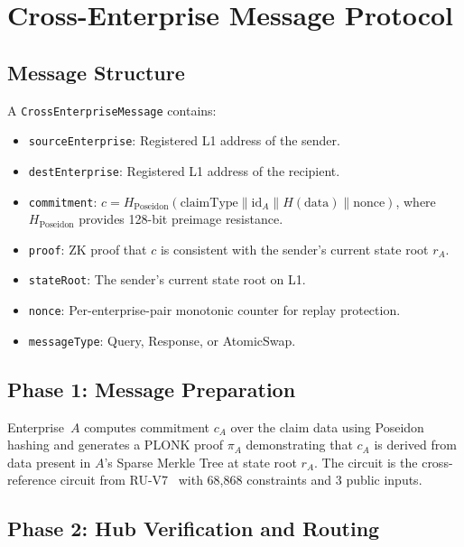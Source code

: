 \documentclass[conference]{IEEEtran}
\begin{document}

\section{Cross-Enterprise Message Protocol}
\label{sec:protocol}

\subsection{Message Structure}

A \texttt{CrossEnterpriseMessage} contains:

\begin{itemize}
  \item \texttt{sourceEnterprise}: Registered L1 address of the sender.
  \item \texttt{destEnterprise}: Registered L1 address of the recipient.
  \item \texttt{commitment}: $c = H_{\text{Poseidon}}(\text{claimType} \| \text{id}_A \| H(\text{data}) \| \text{nonce})$, where $H_{\text{Poseidon}}$ provides 128-bit preimage resistance.
  \item \texttt{proof}: ZK proof that $c$ is consistent with the sender's current state root $r_A$.
  \item \texttt{stateRoot}: The sender's current state root on L1.
  \item \texttt{nonce}: Per-enterprise-pair monotonic counter for replay protection.
  \item \texttt{messageType}: Query, Response, or AtomicSwap.
\end{itemize}

\subsection{Phase 1: Message Preparation}

Enterprise~$A$ computes commitment $c_A$ over the claim data using Poseidon
hashing and generates a PLONK proof $\pi_A$ demonstrating that $c_A$ is
derived from data present in $A$'s Sparse Merkle Tree at state root $r_A$.
The circuit is the cross-reference circuit from RU-V7~\cite{ruv7} with
68,868 constraints and 3 public inputs.

\subsection{Phase 2: Hub Verification and Routing}
\end{document}

